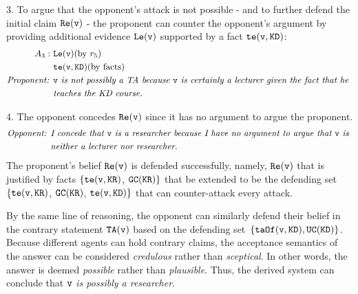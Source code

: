 \begin{example}
3. To argue that the opponent's attack is not possible - and to further defend the initial claim $\texttt{\textup{Re}}(\texttt{\textup{v}})$ - the proponent can counter the opponent's argument by providing additional evidence $\texttt{\textup{Le}}(\texttt{\textup{v}})$ supported by a fact $\texttt{\textup{te}}(\texttt{\textup{v}}, \texttt{\textup{KD}})$:
%
%
\begin{align*}
     A_3 :\ & \texttt{\textup{Le}}(\texttt{\textup{v}}) (\text{by } r_5) \\
           & \texttt{\textup{te}}(\texttt{\textup{v}}, \texttt{\textup{KD}})(\text{by facts})\\
     \emph{Proponent: } & \emph{$\texttt{\textup{v}}$ is not possibly a TA because } \texttt{\textup{v}} \emph{ is certainly a lecturer given the fact that he } \\
    & \emph{teaches the KD course.}
\end{align*}

4. The opponent concedes $\texttt{\textup{Re}}(\texttt{\textup{v}})$ since it has no argument to argue the proponent.
%
\begin{align*}
     \emph{Opponent: } & \emph{I concede  that $\texttt{\textup{v}}$ is a researcher because I have no argument to argue that } \texttt{\textup{v}} \emph{ is } \\
    & \emph{neither a lecturer nor researcher.}
\end{align*}
%
%
The proponent's belief $\texttt{\textup{Re}}(\texttt{\textup{v}})$ is defended successfully, namely, $\texttt{\textup{Re}}(\texttt{\textup{v}})$ that is justified by facts $\{\texttt{\textup{te}}(\texttt{\textup{v}}, \texttt{\textup{KR}})$, $\texttt{\textup{GC}}(\texttt{\textup{KR}})\}$ that be extended to be the defending set $\{\texttt{\textup{te}}(\texttt{\textup{v}}, \texttt{\textup{KR}})$, $\texttt{\textup{GC}}(\texttt{\textup{KR}})$, $\texttt{\textup{te}}(\texttt{\textup{v}}, \texttt{\textup{KD}})\}$ that can counter-attack every attack.

By the same line of reasoning, the opponent can similarly defend their belief in the contrary statement $\texttt{\textup{TA}}(\texttt{\textup{v}})$ based on the defending set~$\{\texttt{\textup{taOf}}(\texttt{\textup{v}}, \texttt{\textup{KD}}), \texttt{\textup{UC}}(\texttt{\textup{KD}})\}$.
Because different agents can hold contrary claims, the acceptance semantics of the answer can be considered \emph{credulous} rather than \emph{sceptical}. In other words, the answer is deemed \emph{possible} rather than \emph{plausible}. Thus, the derived system can conclude that $\texttt{\textup{v}}$ \emph{is possibly a researcher}.
    
\end{example}



